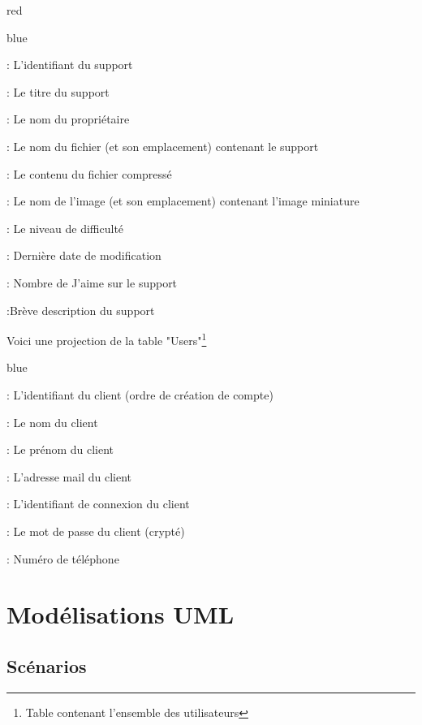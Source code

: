 {\begin{items}{red}{\Triangle}
\begin{items}{blue}{\Triangle}
\item {}  : L'identifiant du support
\item {}  : Le titre du support
\item {}  : Le nom du propriétaire
\item {}  : Le nom du fichier (et son emplacement) contenant le support
\item {}  : Le contenu du fichier compressé
\item {}  : Le nom de l'image (et son emplacement) contenant l'image miniature
\item {} : Le niveau de difficulté
\item {} : Dernière date de modification
\item {} : Nombre de J'aime sur le support
\item {}  :Brève description du support
\end{items}
\item Voici une projection de la table "Users"\footnote{Table contenant l'ensemble des utilisateurs}

\begin{items}{blue}{\Triangle}

\item {}  : L'identifiant du client (ordre de création de compte)
\item {}  : Le nom du client
\item {}  : Le prénom du client
\item {}  : L'adresse mail du client
\item {}  : L'identifiant de connexion du client
\item {}  : Le mot de passe du client (crypté)
\item {} : Numéro de téléphone
\end{items}

\end{items}



\newpage

\chapter{Modélisations UML}

\section{Scénarios}

}
